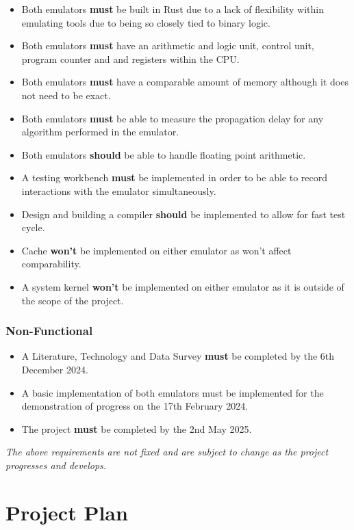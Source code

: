 \documentclass{article}
\begin{document}
\begin{itemize}
  \item Both emulators \textbf{must} be built in Rust due to a lack of flexibility within emulating tools due to being 
  so closely tied to binary logic. 
  \item Both emulators \textbf{must} have an arithmetic and logic unit, control unit, program counter and 
  and registers within the CPU.
  \item Both emulators \textbf{must} have a comparable amount of memory although it does not need to be exact.
  \item Both emulators \textbf{must} be able to measure the propagation delay for any algorithm performed in the emulator.
  \item Both emulators \textbf{should} be able to handle floating point arithmetic.
  \item A testing workbench \textbf{must} be implemented in order to be able to record interactions with the emulator 
  simultaneously.
  \item Design and building a compiler \textbf{should} be implemented to allow for fast test cycle.
  \item Cache \textbf{won't} be implemented on either emulator as won't affect comparability.
  \item A system kernel \textbf{won't} be implemented on either emulator as it is outside of the scope of the project.
\end{itemize}

\subsubsection{Non-Functional}

\begin{itemize}
  \item A Literature, Technology and Data Survey \textbf{must} be completed by the 6th December 2024.
  \item A basic implementation of both emulators must be implemented for the demonstration of progress on the 
  17th February 2024.
  \item The project \textbf{must} be completed by the 2nd May 2025.
\end{itemize}

\textit{The above requirements are not fixed and are subject to change as the project progresses and develops.}

\section{Project Plan}
\end{document}
